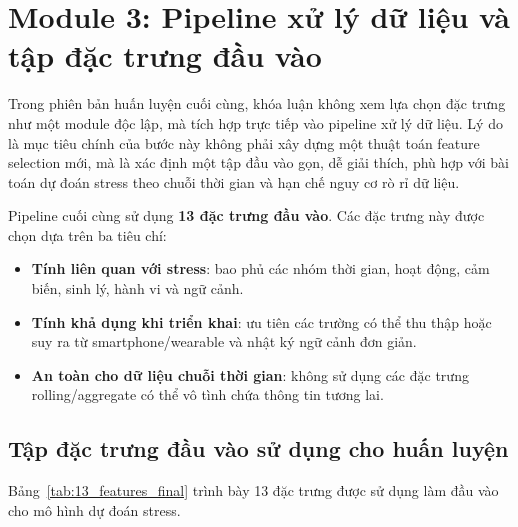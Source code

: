 
\section{Module 3: Pipeline xử lý dữ liệu và tập đặc trưng đầu vào}
\label{sec:data_pipeline}
\label{sec:feature_selection}

Trong phiên bản huấn luyện cuối cùng, khóa luận không xem lựa chọn đặc trưng như một module độc lập, mà tích hợp trực tiếp vào pipeline xử lý dữ liệu. Lý do là mục tiêu chính của bước này không phải xây dựng một thuật toán feature selection mới, mà là xác định một tập đầu vào gọn, dễ giải thích, phù hợp với bài toán dự đoán stress theo chuỗi thời gian và hạn chế nguy cơ rò rỉ dữ liệu.

Pipeline cuối cùng sử dụng \textbf{13 đặc trưng đầu vào}. Các đặc trưng này được chọn dựa trên ba tiêu chí:
\begin{itemize}
    \item \textbf{Tính liên quan với stress}: bao phủ các nhóm thời gian, hoạt động, cảm biến, sinh lý, hành vi và ngữ cảnh.
    \item \textbf{Tính khả dụng khi triển khai}: ưu tiên các trường có thể thu thập hoặc suy ra từ smartphone/wearable và nhật ký ngữ cảnh đơn giản.
    \item \textbf{An toàn cho dữ liệu chuỗi thời gian}: không sử dụng các đặc trưng rolling/aggregate có thể vô tình chứa thông tin tương lai.
\end{itemize}

\subsection{Tập đặc trưng đầu vào sử dụng cho huấn luyện}
\label{subsec:input_feature_set}

Bảng~\ref{tab:13_features_final} trình bày 13 đặc trưng được sử dụng làm đầu vào cho mô hình dự đoán stress.


